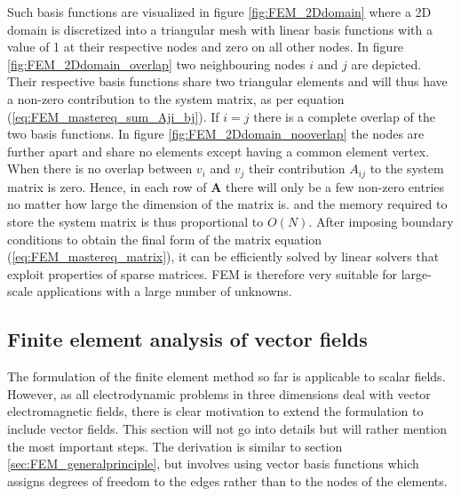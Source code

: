 Such basis functions are visualized in figure \ref{fig:FEM_2Ddomain} where a 2D domain is discretized into a triangular mesh with linear basis functions with a value of 1 at their respective nodes and zero on all other nodes. In figure \ref{fig:FEM_2Ddomain_overlap} two neighbouring nodes $i$ and $j$ are depicted. Their respective basis functions share two triangular elements and will thus have a non-zero contribution to the system matrix, as per equation (\ref{eq:FEM_mastereq_sum_Aji_bj}). If $i=j$ there is a complete overlap of the two basis functions. In figure \ref{fig:FEM_2Ddomain_nooverlap} the nodes are further apart and share no elements except having a common element vertex. When there is no overlap between $v_i$ and $v_j$ their contribution $A_{ij}$ to the system matrix is zero. Hence, in each row of $\mathbf{A}$ there will only be a few non-zero entries no matter how large the dimension of the matrix is. and the memory required to store the system matrix is thus proportional to $O(N)$\cite{FEM_TheoryAndCompOfEM_Jian-Ming_Jin}. After imposing boundary conditions to obtain the final form of the matrix equation (\ref{eq:FEM_mastereq_matrix}), it can be efficiently solved by linear solvers that exploit properties of sparse matrices\cite{FEM_TheoryAndCompOfEM_Jian-Ming_Jin}. FEM is therefore very suitable for large-scale applications with a large number of unknowns.

\subsection{Finite element analysis of vector fields}
The formulation of the finite element method so far is applicable to scalar fields. However, as all electrodynamic problems in three dimensions deal with vector electromagnetic fields, there is clear motivation to extend the formulation to include vector fields. This section will not go into details but will rather mention the most important steps. The derivation is similar to section \ref{sec:FEM_generalprinciple}, but involves using vector basis functions which assigns degrees of freedom to the edges rather than to the nodes of the elements\cite{FEM_in_EM_jianming_jin}.%

